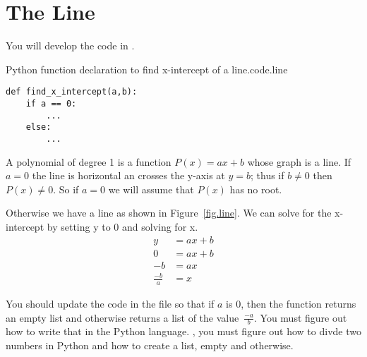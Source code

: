 \section{The Line}
\label{sec.line}

You will develop the code in .

\begin{listing}{Python function declaration to find x-intercept of a line.}{code.line}
\begin{minipage}[c]{0.95\textwidth}\begin{lstlisting}
def find_x_intercept(a,b):
    if a == 0:
        ... 
    else:
        ...
\end{lstlisting}\end{minipage}\end{listing}





A polynomial of degree 1 is a function $P(x)=a x + b$ whose graph is a line.   If $a=0$ the
line is horizontal an crosses the y-axis at $y=b$; thus if $b\neq 0$ then $P(x)\neq 0$.
So if $a=0$ we will assume that $P(x)$ has no root.   

Otherwise we have a line as shown in Figure~\ref{fig.line}.   We can solve for the x-intercept by setting y to 0 and solving for x.
\begin{align*}
  y &= a x + b\\
  0 &= a x + b\\
  -b &= a x\\
  \frac{-b}{a} &= x
\end{align*}


You should update the code in the file  so that if
$a$ is 0, then the function returns an empty list and otherwise
returns a list of the value~$\frac{-a}{b}$.  You must figure out how
to write that in the Python language.  \Ie, you must figure out how to
divde two numbers in Python and how to create a list, empty and
otherwise.

